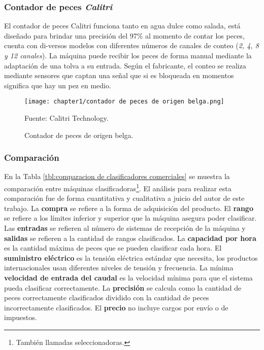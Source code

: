 \subsubsection{Contador de peces \textit{Calitri}}

El contador de peces Calitri funciona tanto en agua dulce como salada, está diseñado para brindar una precisión del 97\% al momento de contar los peces, cuenta con di-versos modelos con diferentes números de canales de conteo (\textit{2, 4, 8 y 12 canales}). La máquina puede recibir los peces de forma manual mediante la adaptación de una tolva a su entrada.\cite{Calitri2018} Según el fabricante, el conteo se realiza mediante sensores que captan una señal que si es bloqueada en momentos significa que hay un pez en medio.

\begin{figure}[H]
	\centering
	\texttt{[image: chapter1/contador de peces de origen belga.png]}
	\caption{Contador de peces de origen belga.}
	Fuente: Calitri Technology.
	\label{fig:contador de peces de origen belga}
\end{figure}

\subsubsection{Comparación}

En la Tabla \ref{tbl:comparacion de clasificadores comerciales} se muestra la comparación entre máquinas clasificadoras\footnote{También llamadas seleccionadoras.}. El análisis para realizar esta comparación fue de forma cuantitativa y cualitativa a juicio del autor de este trabajo. La \textbf{compra} se refiere a la forma de adquisición del producto. El \textbf{rango} se refiere a los límites inferior y superior que la máquina asegura poder clasificar. Las \textbf{entradas} se refieren al número de sistemas de recepción de la máquina y \textbf{salidas} se refieren a la cantidad de rangos clasificados. La \textbf{capacidad por hora} es la cantidad máxima de peces que se pueden clasificar cada hora. El \textbf{suministro eléctrico} es la tensión eléctrica estándar que necesita, los productos internacionales usan diferentes niveles de tensión y frecuencia.  La mínima \textbf{velocidad de entrada del caudal} es la velocidad mínima para que el sistema pueda clasificar correctamente. La \textbf{precisión} se calcula como la cantidad de peces correctamente clasificados dividido con la cantidad de peces incorrectamente clasificados. El \textbf{precio} no incluye cargos por envío o de impuestos.

